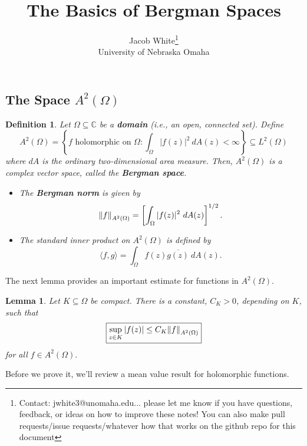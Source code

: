\documentclass[10pt]{article}
\title{\textbf{The Basics of Bergman Spaces}}
\date{}
\author{Jacob White\footnote{Contact: jwhite3@unomaha.edu... please let me know if you have questions, feedback, or ideas on how to improve these notes! You can also make pull requests/issue requests/whatever how that works on the github repo for this document} \\ University of Nebraska Omaha}
\theoremstyle{plain}
\newtheorem{definition}{Definition}
\newtheorem{lemma}{Lemma}
\begin{document}
	\maketitle 
	

\subsection*{The Space $A^2(\Omega)$}

	\begin{definition}
		Let $\Omega \subseteq \mathbb{C}$ be a \textbf{\textit{domain}} (i.e., an open, connected set). Define $$A^2(\Omega) = \left\{f \text{ holomorphic on } \Omega: \int_\Omega |f(z)|^2 \ dA(z) < \infty\right\} \subseteq L^2(\Omega)$$ where $dA$ is the ordinary two-dimensional area measure. Then, $A^2(\Omega)$ is a complex vector space, called the \textbf{\textit{Bergman space}}. 
			\begin{itemize}
				\item The \textbf{\textit{Bergman norm}} is given by $$\norm{f}_{A^2(\Omega)} = \left[\int_\Omega |f(z)|^2  \ dA(z)\right]^{1/2}.$$
				
				\item The standard inner product on $A^2(\Omega)$ is defined by $$\langle f, g \rangle = \int_\Omega f(z) \overline{g(z)} \ dA(z).$$
			\end{itemize} 
	\end{definition}
	
	The next lemma provides an important estimate for functions in $A^2(\Omega)$. 
	
	\begin{lemma}
		
		Let $K \subseteq \Omega$ be compact. There is a constant, $C_K > 0$, depending on $K$, such that $$\boxed{\sup_{z \in K} |f(z)| \leq C_K \norm{f}_{A^2(\Omega)}}$$ for all $f \in A^2(\Omega).$ 
		
	\end{lemma} 
	
	\noindent Before we prove it, we'll review a mean value result for holomorphic functions.
	
\end{document}
